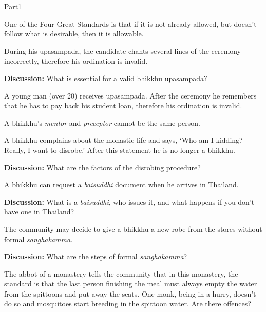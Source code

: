 \documentclass[11pt,oneside]{memoir}
\begin{document}
\begin{exam}{Part1}
\begin{problem*}
\begin{parts}
  \item {} One of the Four Great Standards is that if it is not already allowed,
    but doesn't follow what is desirable, then it is allowable.

  \item {} During his upasampada, the candidate chants several lines of the
    ceremony incorrectly, therefore his ordination is invalid.

    \bigskip

    \textbf{Discussion:} What is essential for a valid bhikkhu upasampada?
    
  \item {} A young man (over 20) receives upasampada. After the ceremony he remembers
    that he has to pay back his student loan, therefore his ordination is invalid.

  \item {} A bhikkhu's \emph{mentor} and \emph{preceptor} cannot be the same
    person.

  \item {} A bhikkhu complains about the monastic life and says, `Who am I kidding? Really,
    I want to disrobe.' After this statement he is no longer a bhikkhu.

    \bigskip

    \textbf{Discussion:} What are the factors of the disrobing procedure?

  \item {} A bhikkhu can request a \emph{baisuddhi} document when he arrives in Thailand.

    \bigskip

    \textbf{Discussion:} What is a \emph{baisuddhi}, who issues it, and what happens if you don't have one in Thailand?

  \item {} The community may decide to give a bhikkhu a new robe from the stores without formal \emph{sanghakamma}. 

    \bigskip

    \textbf{Discussion:} What are the steps of formal \emph{sanghakamma}?

  \end{parts}

\end{problem*}

\problemDivide

\begin{problem}

  The abbot of a monastery tells the community that in this monastery, the
  standard is that the last person finishing the meal must always empty the
  water from the spittoons and put away the seats. One monk, being in a hurry,
  doesn't do so and mosquitoes start breeding in the spittoon water. Are there
  offences?


\end{problem}
\end{exam}
\end{document}
